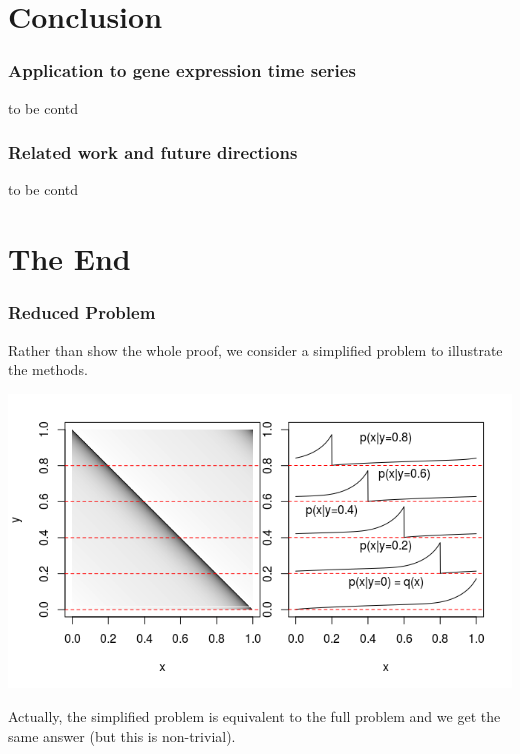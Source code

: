 \documentclass{beamer}
\begin{document}
\section{Conclusion}

\begin{frame}
\sectionpage
\end{frame}


\begin{frame}
\frametitle{Application to gene expression time series}
to be contd
\end{frame}

\begin{frame}
\frametitle{Related work and future directions}
to be contd
\end{frame}

\section{The End}

\begin{frame}
\sectionpage
\end{frame}


\begin{frame}
\frametitle{Reduced Problem}
Rather than show the whole proof, we consider a simplified problem to illustrate the methods.
\begin{center}
\includegraphics[scale = 0.5]{../diagram/qxplot.png}
\end{center}

Actually, the simplified problem is equivalent to the full problem and we get the same answer (but this is non-trivial).
\end{frame}
\end{document}
